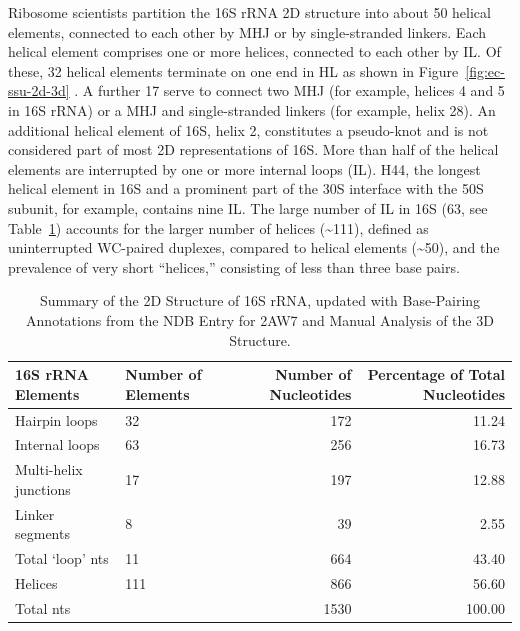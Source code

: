 Ribosome scientists partition the 16S rRNA 2D structure into about 50 helical
elements, connected to each other by MHJ or by single-stranded linkers. Each
helical element comprises one or more helices, connected to each other by IL. Of
these, 32 helical elements terminate on one end in HL as shown in
Figure~\ref{fig:ec-ssu-2d-3d} \cite{Petrov2013a,Yusupov2001}. A further 17 serve to
connect two MHJ (for example, helices 4 and 5 in 16S rRNA) or a MHJ and
single-stranded linkers (for example, helix 28). An additional helical element
of 16S, helix 2, constitutes a pseudo-knot and is not considered part of most 2D
representations of 16S. More than half of the helical elements are interrupted
by one or more internal loops (IL). H44, the longest helical element in 16S and
a prominent part of the 30S interface with the 50S subunit, for example,
contains nine IL. The large number of IL in \EC{} 16S (63, see
Table~\ref{tab:ec-element-count}) accounts for the larger number of helices
(\textasciitilde 111), defined as uninterrupted WC-paired duplexes, compared to helical
elements (\textasciitilde 50), and the prevalence of very short ``helices,'' consisting of
less than three base pairs. 

\begin{table}[ht]
  \begin{tabular}{llrr}
    \toprule
    16S rRNA Elements     & Number of Elements & Number of Nucleotides  & Percentage of Total Nucleotides \\
    \midrule
    Hairpin loops         & 32                 & 172                    & 11.24 \\
    Internal loops        & 63                 & 256                    & 16.73 \\
    Multi-helix junctions & 17                 & 197                    & 12.88 \\
    Linker segments       & 8                  & 39                     & 2.55 \\
    Total ‘loop’ nts      & 11                 & 664                    & 43.40 \\
    Helices               & 111                & 866                    & 56.60 \\
    Total nts             &                    & 1530                   & 100.00 \\
    \bottomrule
  \end{tabular}
  \caption{Summary of the 2D Structure of \EC{} 16S rRNA,
    updated with Base-Pairing Annotations from the NDB Entry for 2AW7 and Manual
  Analysis of the 3D Structure.}
  \label{tab:ec-element-count}
\end{table}

